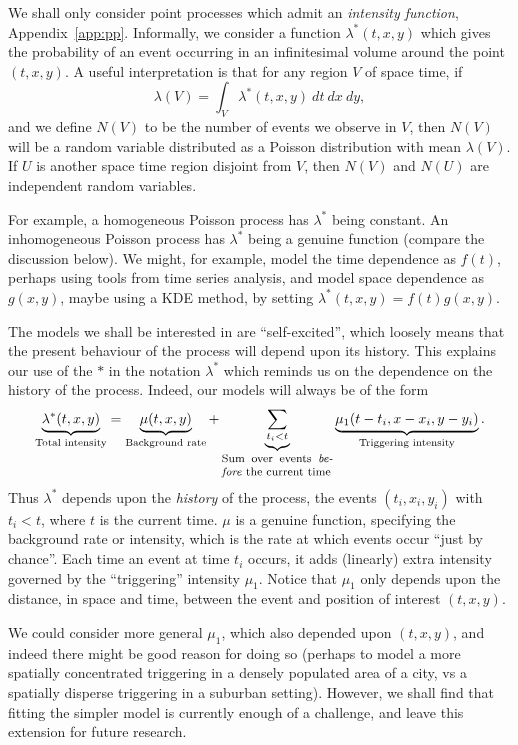 \documentclass[twoside,a4paper]{article}
\theoremstyle{plain}
\theoremstyle{definition}
\begin{document}
We shall only consider point processes which admit an \emph{intensity function},
Appendix~\ref{app:pp}.  Informally, we consider a function $\lambda^*(t,x,y)$ which gives
the probability of an event occurring in an infinitesimal volume around the point $(t,x,y)$.
A useful interpretation is that for any region $V$ of space time, if
\begin{equation}
\lambda(V) = \int_V \lambda^*(t,x,y) \ dt \ dx \ dy,
\label{eq:exp_poisson}
\end{equation}
and we define $N(V)$ to be the number of events we observe in $V$, then $N(V)$ will be a
random variable distributed as a Poisson distribution with mean $\lambda(V)$.  If $U$ is
another space time region disjoint from $V$, then $N(V)$ and $N(U)$ are independent random
variables.

For example, a homogeneous Poisson process has $\lambda^*$ being constant.  An inhomogeneous
Poisson process has $\lambda^*$ being a genuine function (compare the discussion below).
We might, for example, model the time dependence as $f(t)$, perhaps using tools from time
series analysis, and model space dependence as $g(x,y)$, maybe using a KDE method, by setting
$\lambda^*(t,x,y) = f(t) g(x,y)$.

The models we shall be interested in are ``self-excited'', which loosely means that the present
behaviour of the process will depend upon its history.  This explains our use of the $*$ in
the notation $\lambda^*$ which reminds us on the dependence on the history of the process.
Indeed, our models will always be of the form
\[ \underbrace{\lambda^*(t,x,y)}_{\text{Total intensity}}
= \underbrace{\mu(t,x,y)}_{\text{Background rate}}
+ \underbrace{\sum_{t_i < t}}_{\parbox{1.1in}{\footnotesize Sum over events \emph{before} the current time}}
\underbrace{\mu_1(t-t_i, x-x_i, y-y_i)}_{\text{Triggering intensity}}. \]
Thus $\lambda^*$ depends upon the \emph{history} of the process, the events $(t_i,x_i,y_i)$
with $t_i<t$, where $t$ is the current time.  $\mu$ is a genuine function, specifying the
background rate or intensity, which is the rate at which events occur ``just by
chance''.  Each time an event at time $t_i$ occurs, it adds (linearly) extra intensity
governed by the ``triggering'' intensity $\mu_1$.  Notice that $\mu_1$ only depends upon
the distance, in space and time, between the event and position of interest $(t,x,y)$.

We could consider more general $\mu_1$, which also depended upon $(t,x,y)$, and indeed there
might be good reason for doing so (perhaps to model a more spatially concentrated
triggering in a densely populated area of a city, vs a spatially disperse triggering
in a suburban setting).  However, we shall find that fitting the simpler model is
currently enough of a challenge, and leave this extension for future research.
\end{document}
